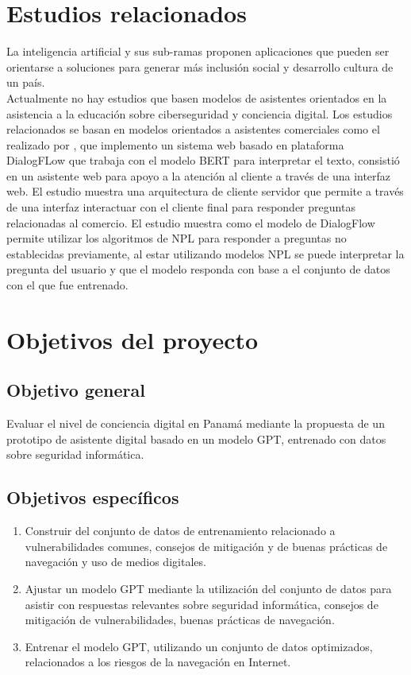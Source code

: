 \section{Estudios relacionados}\label{section: Estudios relacionados}
La inteligencia artificial y sus sub-ramas proponen aplicaciones que pueden ser orientarse a soluciones para generar más inclusión social y desarrollo cultura de un país. \\
Actualmente no hay estudios que basen modelos de asistentes orientados en la asistencia a la educación sobre ciberseguridad y conciencia digital. Los estudios relacionados se basan en modelos orientados a asistentes comerciales como el realizado por \cite{Eleannor2022}, que implemento un sistema web basado en plataforma DialogFLow que trabaja con el modelo BERT para interpretar el texto, consistió en un asistente web para apoyo a la atención al cliente a través de una interfaz web. El estudio muestra una arquitectura de cliente servidor que permite a través de una interfaz interactuar con el cliente final para responder preguntas relacionadas al comercio. El estudio muestra como el modelo de DialogFlow permite utilizar los algoritmos de NPL para responder a preguntas no establecidas previamente, al estar utilizando modelos NPL se puede interpretar la pregunta del usuario y que el modelo responda con base a el conjunto de datos con el que fue entrenado.
\section{Objetivos del proyecto}\label{section:Objetivos del proyecto}
\subsection{Objetivo general}\label{section:Objetivo general}
Evaluar el nivel de conciencia digital en Panamá mediante la propuesta  de un prototipo de asistente digital basado en un modelo GPT, entrenado con datos sobre seguridad informática.
\subsection{Objetivos específicos}\label{section:Objetivos especificos}
 \begin{enumerate}
        \item Construir del conjunto de datos de entrenamiento relacionado a vulnerabilidades comunes, consejos de mitigación y de buenas prácticas de navegación y uso de medios digitales.
        \item Ajustar un modelo GPT mediante la utilización del conjunto de datos para asistir con respuestas relevantes sobre seguridad informática, consejos de mitigación de vulnerabilidades, buenas prácticas de navegación.
        \item Entrenar el modelo GPT, utilizando un conjunto de datos optimizados, relacionados a los riesgos de la navegación en Internet. 
    \end{enumerate}
    

